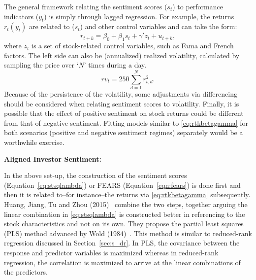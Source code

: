 The general framework relating the sentiment scores ($s_t$) to performance indicators ($y_t$) is simply through lagged regression. For example, the returns $r_t(y_t)$ are related to ($s_t$) and other control variables and can take the form:
	\begin{equation} \label{eq:rtkbetagamma}
	r_{t+k}= \beta_0 + \beta_1 s_t + \gamma' z_t + u_{t+k},
	\end{equation}
where $z_t$ is a set of stock-related control variables, such as Fama and French factors. The left side can also be (annualized) realized volatility, calculated by sampling the price over `$N$' times during a day. 
	\begin{equation}
	rv_t = 250 \sum_{d=1}^N r_{t,d}^2.
	\end{equation}
Because of the persistence of the volatility, some adjustments via differencing should be considered when relating sentiment scores to volatility. Finally, it is possible that the effect of positive sentiment on stock returns could be different from that of negative sentiment. Fitting models similar to \eqref{eq:rtkbetagamma} for both scenarios (positive and negative sentiment regimes) separately would be a worthwhile exercise. \twomedskip


\noindent\textbf{Aligned Investor Sentiment:} \twomedskip


In the above set-up, the construction of the sentiment scores (Equation~\ref{eq:stsqlambda}) or FEARS (Equation~\ref{eqn:fears}) is done first and then it is related to--for instance--the returns via \eqref{eq:rtkbetagamma} subsequently. Huang, Jiang, Tu and Zhou (2015)~\cite{huang} combine the two steps, together arguing the linear combination in \eqref{eq:stsqlambda} is constructed better in referencing to the stock characteristics and not on its own. They propose the partial least squares (PLS) method advanced by Wold (1984)~\cite{wold}. This method is similar to reduced-rank regression discussed in Section~\ref{sec:s_dr}. In PLS, the covariance between the response and predictor variables is maximized whereas in reduced-rank regression, the correlation is maximized to arrive at the linear combinations of the predictors. \twomedskip


